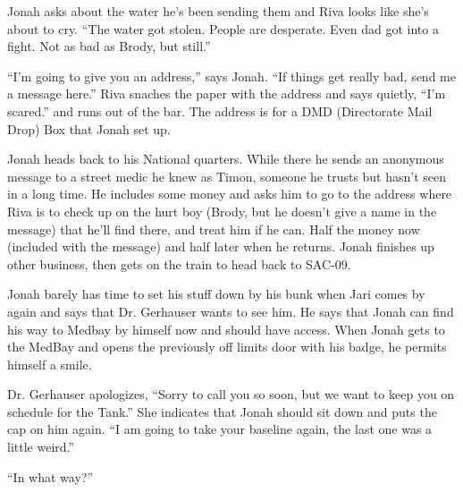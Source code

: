 Jonah asks about the water he's been sending them and Riva looks like she's about to cry.  ``The water got stolen.  People are desperate.  Even dad got into a fight.  Not as bad as Brody, but still.''



``I'm going to give you an address,'' says Jonah. ``If things get really bad, send me a message here.''  Riva snaches the paper with the address and says quietly, ``I'm scared.'' and runs out of the bar.  The address is for a DMD (Directorate Mail Drop) Box that Jonah set up.



Jonah heads back to his National quarters.  While there he sends an anonymous message to a street medic he knew as Timon, someone he trusts but hasn't seen in a long time.  He includes some money and asks him to go to the address where Riva is to check up on the hurt boy (Brody, but he doesn't give a name in the message) that he'll find there, and treat him if he can.  Half the money now (included with the message) and half later when he returns.  Jonah finishes up other business, then gets on the train to head back to SAC-09.




Jonah barely has time to set his stuff down by his bunk when Jari comes by again and says that Dr. Gerhauser wants to see him.  He says that Jonah can find his way to Medbay by himself now and should have access.  When Jonah gets to the MedBay and opens the previously off limits door with his badge, he permits himself a smile.



Dr. Gerhauser apologizes, ``Sorry to call you so soon, but we want to keep you on schedule for the Tank.''  She indicates that Jonah should sit down and puts the cap on him again.  ``I am going to take your baseline again, the last one was a little weird.''

``In what way?''

